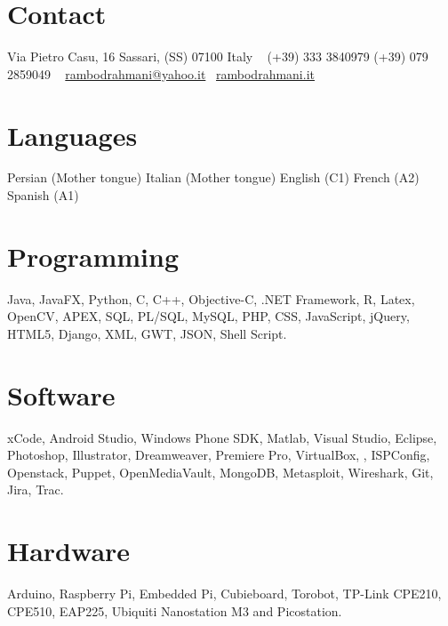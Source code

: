 \documentclass[]{friggeri-cv} %
\begin{document}


\begin{aside} %
\section{Contact}
Via Pietro Casu, 16
Sassari, (SS) 07100
Italy
~
(+39) 333 3840979
(+39) 079 2859049
~
\small{\href{mailto:rambodrahmani@yahoo.it}{{rambodrahmani@yahoo.it}}}
\small{{\faGlobe}}~\href{http://rambodrahmani.it}{{rambodrahmani.it}}\vspace{6mm}
\section{Languages}
Persian (Mother tongue)
Italian (Mother tongue)
English (C1)
French (A2)
Spanish (A1)\vspace{6mm}
\section{Programming \small{\textcolor{magenta}{{\faHeart}}}}
Java, JavaFX, Python, C, C++, Objective-C, .NET Framework, R, Latex, OpenCV, APEX, SQL, PL/SQL, MySQL, PHP, CSS, JavaScript, jQuery, HTML5, Django, XML, GWT, JSON, Shell Script.\vspace{6mm}
\section{Software}
xCode, Android Studio, Windows Phone SDK, Matlab, Visual Studio, Eclipse, Photoshop, Illustrator, Dreamweaver, Premiere Pro, VirtualBox, , ISPConfig, Openstack, Puppet, OpenMediaVault, MongoDB, Metasploit, Wireshark, Git, Jira, Trac.\vspace{6mm}
\section{Hardware}
Arduino, Raspberry Pi, Embedded Pi, Cubieboard, Torobot, TP-Link CPE210, CPE510, EAP225, Ubiquiti Nanostation M3 and Picostation.
\end{aside}
\end{document}

